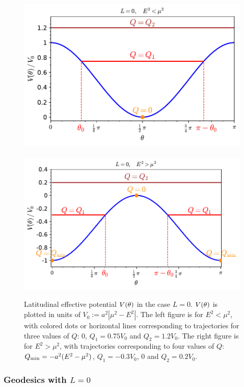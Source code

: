 \begin{figure}
\centerline{\includegraphics[height=0.24\textheight]{gek_th_pot_L_0_low_E.pdf}
\ \includegraphics[height=0.24\textheight]{gek_th_pot_L_0_high_E.pdf}}
\caption[]{\label{f:gek:th_pot_L_0} \footnotesize
Latitudinal effective potential $V(\theta)$ in the case $L=0$. $V(\theta)$ is plotted
in units of $V_0 := a^2|\mu^2 - E^2|$.
The left figure is for $E^2 < \mu^2$, with colored dots or horizontal lines
corresponding to trajectories for three values of $Q$:
$0$, $Q_1 = 0.75 V_0$ and $Q_2 = 1.2 V_0$.
The right figure is for $E^2 > \mu^2$, with trajectories corresponding
to four values of $Q$: $Q_{\rm min} = -a^2(E^2 - \mu^2)$,
$Q_1 = -0.3 V_0$, $0$ and $Q_2 = 0.2 V_0$.
}
\end{figure}



\subsubsection{Geodesics with $L=0$}

